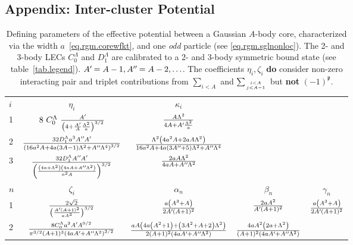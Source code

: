 \documentclass[aps,nofootinbib,prl,showpacs,twocolumn,groupedaddress,superscriptaddress]
{revtex4}
\newcommand*{\mprime}{^{\prime}\mkern-1.2mu}
\newcommand*{\mdprime}{^{\prime\prime}\mkern-1.2mu}
\begin{document}
\begin{widetext}
\begin{turnpage}
\section{Appendix: Inter-cluster Potential}
\begin{table}
\setlength{\tabcolsep}{4pt}
\renewcommand{\arraystretch}{2.4}
\caption{\label{tab.rgmpot}{Defining parameters of the effective potential between
a Gaussian $A$-body core, characterized via the width $a$~\eqref{eq.rgm.corewfkt},
and one {\it odd} particle (see \eqref{eq.rgm.sglnonloc}).
The 2- and 3-body LECs $C^\Lambda_0$ and $D^\Lambda_1$ are
calibrated to a 2- and 3-body symmetric bound state (see table~\ref{tab.legend}).
$A\mprime=A-1, A\mdprime=A-2, \ldots$. The coefficients $\eta_i,\zeta_i$ {\bf do}
consider non-zero interacting pair and triplet contributions from $\sum_{i<A}$ and
$\sum_{i<A\atop j<A-1}$ but {\bf not} $(-1)^{\mathfrak{p}}$.}}
\small\centering
\begin{tabular}{lc|ccc}
\hline\hline
$i$ & $\eta_i$ & $\kappa_i$ & & \\
1   & $8~C_0^\Lambda~\frac{A\mprime}{\left(4+\frac{A\mprime}{A}\frac{\Lambda^2}{a}\right)^{3/2}}$  & $\frac{A\Lambda^2}{4A+A\mprime\frac{\Lambda^2}{a}}$ \\
2   & $
\frac{32 D_1^\Lambda a^3 A\mdprime A\mprime}{\left(16 a^2 A+4 a (3 A-1) \Lambda ^2+A\mdprime \Lambda ^4\right)^{3/2}}$ & $\frac{\Lambda ^2 \left(4 a^2 A+2 a A \Lambda ^2\right)}{16 a^2 A+4 a (3 A\mdprime+5) \Lambda ^2+A\mdprime \Lambda ^4}$ \\
3 & 
$\frac{32 D_1^\Lambda A\mdprime A\mprime}{\left(\frac{\left(4 a+\Lambda ^2\right) \left(4 a A+A\mdprime \Lambda ^2\right)}{a^2 A}\right)^{3/2}}$ & $\frac{2 a A \Lambda ^2}{4 a A+A\mdprime \Lambda ^2}$ \\
\hline
$n$ & $\zeta_i$ & $\alpha_n$ & $\beta_n$ & $\gamma_n$ \\
1 &$\frac{2 \sqrt{2}}{\left(\frac{A\mprime (A+1)^2}{a A^3}\right)^{3/2}}$&
$\frac{a \left(A^3+A\right)}{2 A\mprime (A+1)^2}$&
$\frac{2 a A^2}{A\mprime (A+1)^2}$&
$\frac{a \left(A^3+A\right)}{2 A\mprime (A+1)^2}$\\
2 & 
$ \frac{8 C_0^\Lambda a^3 A\mprime A^{9/2}}{\pi ^{3/2} (A+1)^3 \left(4 a A\mprime+A\mdprime \Lambda ^2\right)^{3/2}}  $ & 
$\frac{\text{} a A \left(4 a \left(A^2+1\right)+\left(3 A^2+A+2\right) \Lambda ^2\right)}{2 (A+1)^2 \left(4 a A\mprime+A\mdprime \Lambda ^2\right)}$&
$\frac{4 \text{} a A^2 \left(2 a+\Lambda ^2\right)}{(A+1)^2 \left(4 a A\mprime+A\mdprime \Lambda ^2\right)}$&

\end{tabular}
\end{table}
\end{turnpage}
\end{widetext}
\end{document}
